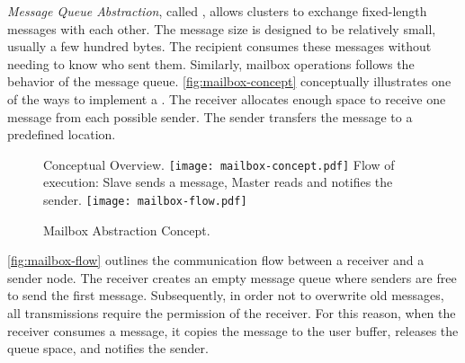 
			\textit{Message Queue Abstraction}, called \mailbox, allows clusters to exchange
			fixed-length messages with each other. The message size is designed to be
			relatively small, usually a few hundred bytes. The recipient consumes these
			messages without needing to know who sent them. Similarly, mailbox operations
			follows the behavior of the \posix message queue. \autoref{fig:mailbox-concept}
			conceptually illustrates one of the ways to implement a \mailbox. The receiver
			allocates enough space to receive one message from each possible sender.
			The sender transfers the message to a predefined location.

			\begin{figure}[!tb]
				\centering%
				\caption{Mailbox Abstraction Concept.}%
				\label{fig:mailbox}%

					{Conceptual Overview.}%
					{\texttt{[image: mailbox-concept.pdf]}}%
				\hspace{1cm}%
					{Flow of execution: Slave sends a message, Master reads and notifies the sender.}%
					{\texttt{[image: mailbox-flow.pdf]}}%

			\end{figure}

			\autoref{fig:mailbox-flow} outlines the communication flow between a
			receiver and a sender node. The receiver creates an empty message queue
			where senders are free to send the first message. Subsequently, in order
			not to overwrite old messages, all transmissions require the permission
			of the receiver. For this reason,  when the receiver consumes a message,
			it copies the message to the user buffer, releases the queue space, and
			notifies the sender.
			
